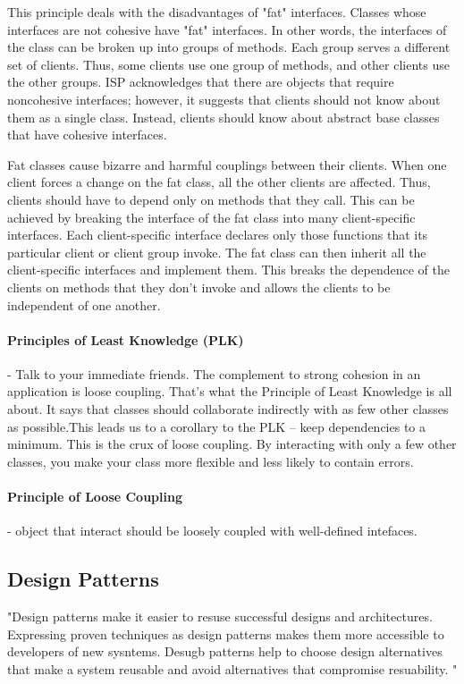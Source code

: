 \documentclass{llncs}
\begin{document}
This principle deals with the disadvantages of "fat" interfaces. 
Classes whose interfaces are not cohesive have "fat" interfaces. 
In other words, the interfaces of the class can be broken up into groups of methods. 
Each group serves a different set of clients.
Thus, some clients use one group of methods, and other clients use the other groups.
ISP acknowledges that there are objects that require noncohesive interfaces; however, it suggests that clients should not know about them as a single class.
Instead, clients should know about abstract base classes that have cohesive interfaces.

Fat classes cause bizarre and harmful couplings between their clients. 
When one client forces a change on the fat class, all the other clients are affected. 
Thus, clients should have to depend only on methods that they call. 
This can be achieved by breaking the interface of the fat class into many client-specific interfaces.
Each client-specific interface declares only those functions that its particular client or client group invoke. 
The fat class can then inherit all the client-specific interfaces and implement them. 
This breaks the dependence of the clients on methods that they don't invoke and allows the clients to be independent of one another.\cite{MartinASD}\cite{Dooley}

\paragraph{Principles of Least Knowledge (PLK)} - Talk to your immediate friends. The complement to strong cohesion in an application is loose coupling. That’s what the Principle of Least Knowledge is all about. It says that classes should collaborate indirectly with as few other classes as possible.This leads us to a corollary to the PLK – keep dependencies to a minimum. This is the crux of loose coupling. By interacting with only a few other classes, you make your class more flexible and less likely to contain errors.  \cite{Dooley}

\paragraph{Principle of Loose Coupling} - object that interact should be loosely coupled with well-defined intefaces.\cite{Dooley}

\subsection{Design Patterns}
"Design patterns make it easier to resuse successful designs and architectures. Expressing proven techniques as design patterns makes them more accessible to developers of new sysntems. Desugb patterns help to choose design alternatives that make a system reusable and avoid alternatives that compromise resuability. "\cite{DesignPatterns}
\end{document}
